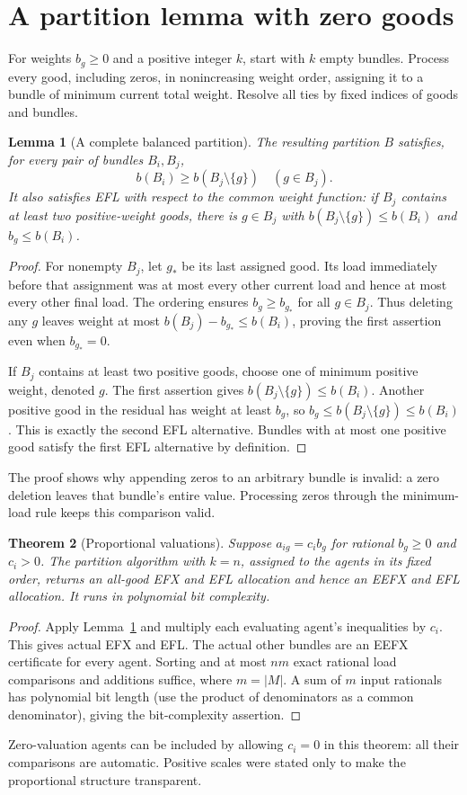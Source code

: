 \documentclass[11pt]{article}
\newtheorem{theorem}{Theorem}
\newtheorem{lemma}[theorem]{Lemma}
\theoremstyle{definition}
\begin{document}
\section{A partition lemma with zero goods}
For weights $b_g\ge0$ and a positive integer $k$, start with $k$ empty
bundles. Process every good, including zeros, in nonincreasing weight
order, assigning it to a bundle of minimum current total weight.
Resolve all ties by fixed indices of goods and bundles.
\begin{lemma}[A complete balanced partition]\label{lpt}
The resulting partition $B$ satisfies, for every pair of bundles $B_i,B_j$,
\[
 b(B_i)\ge b(B_j\setminus\{g\})\quad(g\in B_j).
\]
It also satisfies EFL with respect to the common weight function: if
$B_j$ contains at least two positive-weight goods, there is $g\in B_j$
with $b(B_j\setminus\{g\})\le b(B_i)$ and $b_g\le b(B_i)$.
\end{lemma}
\begin{proof}
For nonempty $B_j$, let $g_*$ be its last assigned good. Its load immediately
before that assignment was at most every other current load and hence at
most every other final load. The ordering ensures $b_g\ge b_{g_*}$ for
all $g\in B_j$. Thus deleting any $g$ leaves weight at most
$b(B_j)-b_{g_*}\le b(B_i)$, proving the first assertion even when
$b_{g_*}=0$.

If $B_j$ contains at least two positive goods, choose one of minimum
positive weight, denoted $g$. The first assertion gives
$b(B_j\setminus\{g\})\le b(B_i)$. Another positive good in the residual
has weight at least $b_g$, so $b_g\le b(B_j\setminus\{g\})\le b(B_i)$.
This is exactly the second EFL alternative. Bundles with at most one
positive good satisfy the first EFL alternative by definition.
\end{proof}
The proof shows why appending zeros to an arbitrary bundle is invalid:
a zero deletion leaves that bundle's entire value. Processing zeros
through the minimum-load rule keeps this comparison valid.

\begin{theorem}[Proportional valuations]\label{proportional}
Suppose $a_{ig}=c_i b_g$ for rational $b_g\ge0$ and $c_i>0$.
The partition algorithm with $k=n$, assigned to the agents in its fixed
order, returns an all-good EFX and EFL allocation and hence an EEFX and
EFL allocation. It runs in polynomial bit complexity.
\end{theorem}
\begin{proof}
Apply Lemma~\ref{lpt} and multiply each evaluating agent's inequalities
by $c_i$. This gives actual EFX and EFL. The actual other bundles are an
EEFX certificate for every agent. Sorting and at most $nm$ exact rational
load comparisons and additions suffice, where $m=|M|$. A sum of $m$
input rationals has polynomial bit length (use the product of denominators
as a common denominator), giving the bit-complexity assertion.
\end{proof}
Zero-valuation agents can be included by allowing $c_i=0$ in this theorem:
all their comparisons are automatic. Positive scales were stated only to
make the proportional structure transparent.
\end{document}
